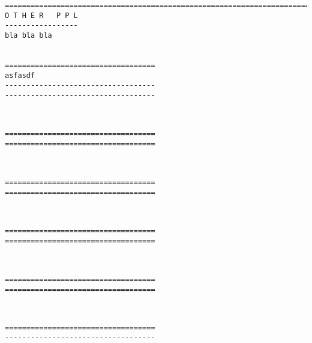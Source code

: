 \goodbreak \begin{samepage} \small \begin{verbatim}
================================================================================
O T H E R   P P L
-----------------
bla bla bla


===================================
asfasdf
-----------------------------------
-----------------------------------
\end{verbatim} \normalsize \end{samepage}

\

\goodbreak \begin{samepage} \small \begin{verbatim}
===================================
===================================
\end{verbatim} \normalsize \end{samepage}

\

\goodbreak \begin{samepage} \small \begin{verbatim}
===================================
===================================
\end{verbatim} \normalsize \end{samepage}

\

\goodbreak \begin{samepage} \small \begin{verbatim}
===================================
===================================
\end{verbatim} \normalsize \end{samepage}

\

\goodbreak \begin{samepage} \small \begin{verbatim}
===================================
===================================
\end{verbatim} \normalsize \end{samepage}

\

\goodbreak \begin{samepage} \small \begin{verbatim}
===================================
-----------------------------------
\end{verbatim} \normalsize \end{samepage}






